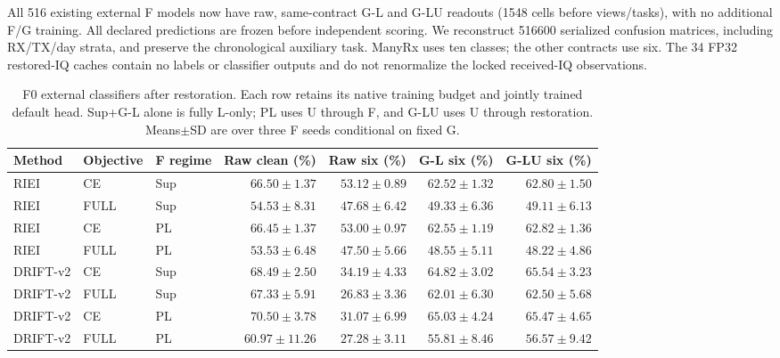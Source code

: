 All 516 existing external F models now have raw, same-contract G-L and G-LU readouts (1548 cells before views/tasks), with no additional F/G training. All declared predictions are frozen before independent scoring. We reconstruct 516600 serialized confusion matrices, including RX/TX/day strata, and preserve the chronological auxiliary task. ManyRx uses ten classes; the other contracts use six. The 34 FP32 restored-IQ caches contain no labels or classifier outputs and do not renormalize the locked received-IQ observations.

\begin{table}[t]\centering\footnotesize\caption{F0 external classifiers after restoration. Each row retains its native training budget and jointly trained default head. Sup+G-L alone is fully L-only; PL uses U through F, and G-LU uses U through restoration. Means$\pm$SD are over three F seeds conditional on fixed G.}\label{tab:external-DURA-complete}\begin{tabular}{lllrrrr}\toprule

Method & Objective & F regime & Raw clean (\%) & Raw six (\%) & G-L six (\%) & G-LU six (\%)\\\midrule

RIEI & CE & Sup & $66.50\pm1.37$ & $53.12\pm0.89$ & $62.52\pm1.32$ & $62.80\pm1.50$\\

RIEI & FULL & Sup & $54.53\pm8.31$ & $47.68\pm6.42$ & $49.33\pm6.36$ & $49.11\pm6.13$\\

RIEI & CE & PL & $66.45\pm1.37$ & $53.00\pm0.97$ & $62.55\pm1.19$ & $62.82\pm1.36$\\

RIEI & FULL & PL & $53.53\pm6.48$ & $47.50\pm5.66$ & $48.55\pm5.11$ & $48.22\pm4.86$\\

DRIFT-v2 & CE & Sup & $68.49\pm2.50$ & $34.19\pm4.33$ & $64.82\pm3.02$ & $65.54\pm3.23$\\

DRIFT-v2 & FULL & Sup & $67.33\pm5.91$ & $26.83\pm3.36$ & $62.01\pm6.30$ & $62.50\pm5.68$\\

DRIFT-v2 & CE & PL & $70.50\pm3.78$ & $31.07\pm6.99$ & $65.03\pm4.24$ & $65.47\pm4.65$\\

DRIFT-v2 & FULL & PL & $60.97\pm11.26$ & $27.28\pm3.11$ & $55.81\pm8.46$ & $56.57\pm9.42$\\


\end{tabular}
\end{table}
